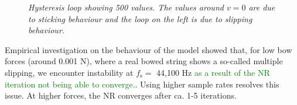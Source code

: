 \documentclass[twoside,a4paper,dvipsnames]{article}
\def\SWcomment[#1]{\textcolor{Green}{#1}}
\begin{document}
\begin{figure}[h]
  \centering
  \caption{\it Hysteresis loop showing 500 values. The values around $v=0$ are due to sticking behaviour and the loop on the left is due to slipping behaviour. \label{fig:hysteresis}}
\end{figure}

Empirical investigation on the behaviour of the model showed that, for low bow forces (around 0.001 N), where a real bowed string shows a so-called multiple slipping, we encounter instability at $f_\text{s} =$ 44,100 Hz \SWcomment[as a result of the NR iteration not being able to converge.]{}. Using higher sample rates resolves this issue. At higher forces, the NR converges after ca. 1-5 iterations.
\end{document}
